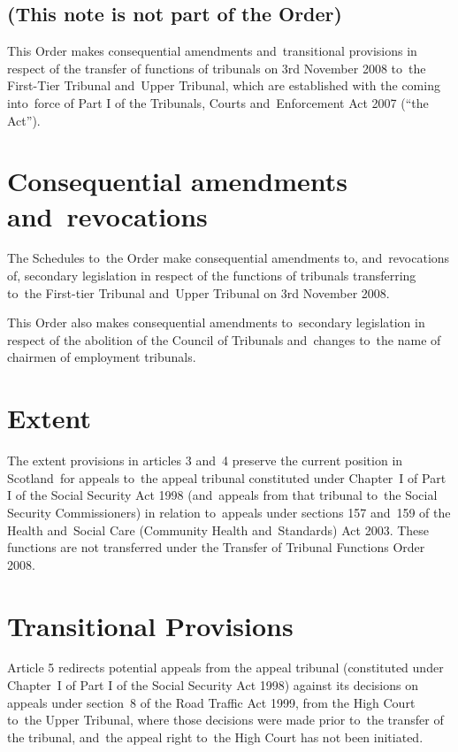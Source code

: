 \documentclass[12pt,a4paper]{article}
\begin{document}
\renewcommand\parthead{— Explanatory Note}

\subsection*{(This note is not part of the Order)}

This Order makes consequential amendments and~transitional provisions in respect of the transfer of functions of tribunals on 3rd November 2008 to~the First-Tier Tribunal and~Upper Tribunal, which are established with the coming into~force of Part I of the Tribunals, Courts and~Enforcement Act 2007 (“the Act”).

\section*{Consequential amendments and~revocations}

The Schedules to~the Order make consequential amendments to, and~revocations of, secondary legislation in respect of the functions of tribunals transferring to~the First-tier Tribunal and~Upper Tribunal on 3rd November 2008.

This Order also makes consequential amendments to~secondary legislation in respect of the abolition of the Council of Tribunals and~changes to~the name of chairmen of employment tribunals.

\section*{Extent}

The extent provisions in articles 3 and~4 preserve the current position in Scotland~for appeals to~the appeal tribunal constituted under Chapter~I of Part I of the Social Security Act 1998 (and~appeals from that tribunal to~the Social Security Commissioners) in relation to~appeals under sections 157 and~159 of the Health and~Social Care (Community Health and~Standards) Act 2003. These functions are not transferred under the Transfer of Tribunal Functions Order 2008.

\section*{Transitional Provisions}

Article 5 redirects potential appeals from the appeal tribunal (constituted under Chapter~I of Part I of the Social Security Act 1998) against its decisions on appeals under section~8 of the Road Traffic Act 1999, from the High Court to~the Upper Tribunal, where those decisions were made prior to~the transfer of the tribunal, and~the appeal right to~the High Court has not been initiated. 
\end{document}
